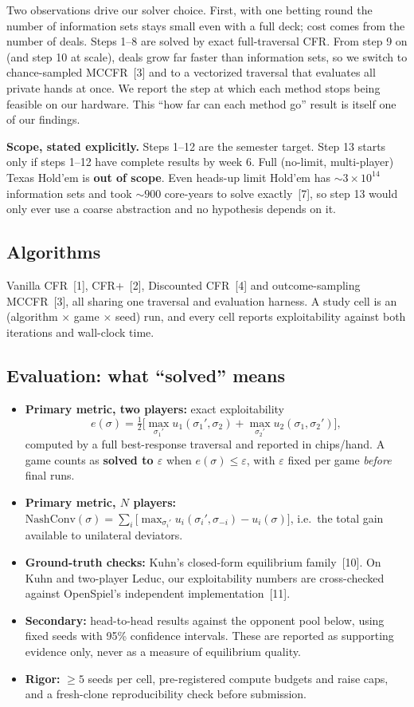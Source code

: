 \documentclass[10pt,a4paper]{article}
\newcommand{\eps}{\varepsilon}
\begin{document}
Two observations drive our solver choice. First, with one betting round the number of information sets stays small even with a full deck; cost comes from the number of deals. Steps 1--8 are solved by exact full-traversal CFR. From step 9 on (and step 10 at scale), deals grow far faster than information sets, so we switch to chance-sampled MCCFR~[3] and to a vectorized traversal that evaluates all private hands at once. We report the step at which each method stops being feasible on our hardware. This ``how far can each method go'' result is itself one of our findings.

\textbf{Scope, stated explicitly.} Steps 1--12 are the semester target. Step 13 starts only if steps 1--12 have complete results by week 6. Full (no-limit, multi-player) Texas Hold'em is \textbf{out of scope}. Even heads-up limit Hold'em has ${\sim}3{\times}10^{14}$ information sets and took ${\sim}900$ core-years to solve exactly~[7], so step 13 would only ever use a coarse abstraction and no hypothesis depends on it.

\subsection{Algorithms}
Vanilla CFR~[1], CFR+~[2], Discounted CFR~[4] and outcome-sampling MCCFR~[3], all sharing one traversal and evaluation harness. A study cell is an (algorithm $\times$ game $\times$ seed) run, and every cell reports exploitability against both iterations and wall-clock time.

\subsection{Evaluation: what ``solved'' means}
\begin{itemize}
  \item \textbf{Primary metric, two players:} exact exploitability
  \[ e(\sigma) = \tfrac{1}{2}\Big[\max_{\sigma_1'} u_1(\sigma_1', \sigma_2) + \max_{\sigma_2'} u_2(\sigma_1, \sigma_2')\Big], \]
  computed by a full best-response traversal and reported in chips/hand. A game counts as \textbf{solved to $\eps$} when $e(\sigma) \le \eps$, with $\eps$ fixed per game \emph{before} final runs.
  \item \textbf{Primary metric, $N$ players:} $\mathrm{NashConv}(\sigma) = \sum_i \big[\max_{\sigma_i'} u_i(\sigma_i', \sigma_{-i}) - u_i(\sigma)\big]$, i.e.\ the total gain available to unilateral deviators.
  \item \textbf{Ground-truth checks:} Kuhn's closed-form equilibrium family~[10]. On Kuhn and two-player Leduc, our exploitability numbers are cross-checked against OpenSpiel's independent implementation~[11].
  \item \textbf{Secondary:} head-to-head results against the opponent pool below, using fixed seeds with 95\% confidence intervals. These are reported as supporting evidence only, never as a measure of equilibrium quality.
  \item \textbf{Rigor:} $\ge 5$ seeds per cell, pre-registered compute budgets and raise caps, and a fresh-clone reproducibility check before submission.
\end{itemize}
\end{document}
